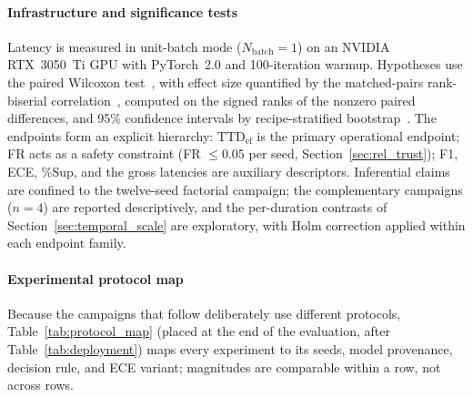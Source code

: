 \documentclass[a4paper,fleqn]{cas-dc}
\begin{document}
\paragraph{Infrastructure and significance tests}
Latency is measured in unit-batch mode ($N_{\text{batch}}=1$) on an
NVIDIA RTX~3050~Ti GPU with PyTorch~2.0 and 100-iteration warmup.
Hypotheses use the paired Wilcoxon test~\cite{wilcoxon1945}, with effect
size quantified by the {\color{\revcolor}matched-pairs rank-biserial
correlation~\cite{kerby2014simple}, computed on the signed ranks of the
nonzero paired differences,} and 95\%
confidence intervals by recipe-stratified
bootstrap~\cite{efron1993introduction}.
{\color{\revcolor}The endpoints form an explicit hierarchy:
$\mathrm{TTD}_{\mathrm{ef}}$ is the primary operational endpoint; FR acts as
a safety constraint (FR $\le 0.05$ per seed, Section~\ref{sec:rel_trust});
F1, ECE, \%Sup, and the gross latencies are auxiliary descriptors.
Inferential claims are confined to the twelve-seed factorial campaign; the
complementary campaigns ($n{=}4$) are reported descriptively, and the
per-duration contrasts of Section~\ref{sec:temporal_scale} are exploratory,
with Holm correction applied within each endpoint family.}
{\color{\revcolor}\paragraph{Experimental protocol map}
Because the campaigns that follow deliberately use different protocols,
Table~\ref{tab:protocol_map} (placed at the end of the evaluation, after
Table~\ref{tab:deployment}) maps every experiment to its seeds, model
provenance, decision rule, and ECE variant; magnitudes are comparable within
a row, not across rows.}
\end{document}
